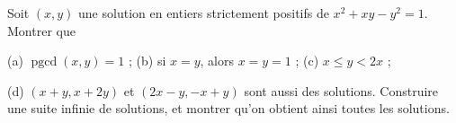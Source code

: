 Soit $(x, y)$ une solution en entiers strictement positifs de $x^2 + xy - y^2 = 1$. Montrer que

(a) $\operatorname{pgcd}(x, y) = 1$ ; (b) si $x = y$, alors $x = y = 1$ ; (c) $x \leq y < 2x$ ;

(d) $(x + y, x + 2y)$ et $(2x - y, -x + y)$ sont aussi des solutions. Construire une suite infinie de solutions, et montrer qu'on obtient ainsi toutes les solutions.
